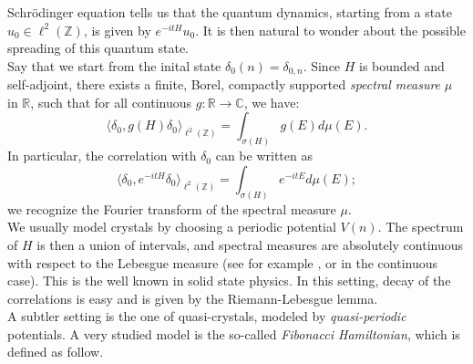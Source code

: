 \documentclass[a4paper]{article}
\theoremstyle{definition}
\begin{document}
Schrödinger equation tells us that the quantum dynamics, starting from a state $u_0 \in \ell^2(\mathbb{Z})$, is given by $e^{-it H} u_0$. It is then natural to wonder about the possible spreading of this quantum state. \\

Say that we start from the inital state $\delta_0(n) = \delta_{0,n}$. Since $H$ is bounded and self-adjoint, there exists a finite, Borel, compactly supported \emph{spectral measure} $\mu$ in $\mathbb{R}$, such that for all continuous $g : \mathbb{R} \rightarrow \mathbb{C}$, we have:
$$ \langle \delta_0, g(H) \delta_0 \rangle_{\ell^2(\mathbb{Z})} = \int_{\sigma(H)} g(E) d\mu(E). $$
In particular, the correlation with $\delta_0$ can be written as
$$ \langle \delta_0, e^{-it H} \delta_0 \rangle_{\ell^2(\mathbb{Z})} = \int_{\sigma(H)} e^{-it E} d\mu(E); $$
we recognize the Fourier transform of the spectral measure $\mu$. \\

We usually model crystals by choosing a periodic potential $V(n)$. The spectrum of $H$ is then a union of intervals, and spectral measures are absolutely continuous with respect to the Lebesgue measure (see for example \cite{DF24}, or \cite{RS78} in the continuous case). This is the well known  in solid state physics. In this setting, decay of the correlations is easy and is given by the Riemann-Lebesgue lemma. \\

A subtler setting is the one of quasi-crystals, modeled by \emph{quasi-periodic} potentials. A very studied model is the so-called \emph{Fibonacci Hamiltonian}, which is defined as follow. \\
\end{document}
